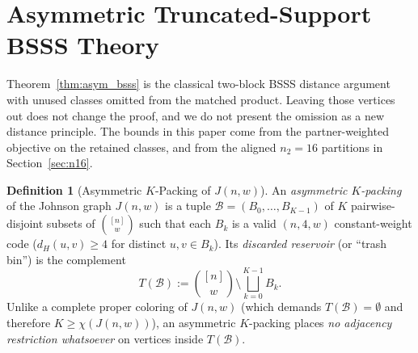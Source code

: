 \documentclass[11pt,letterpaper]{article}
\theoremstyle{plain}
\theoremstyle{definition}
\newtheorem{definition}{Definition}
\theoremstyle{remark}
\begin{document}
\section{Asymmetric Truncated-Support BSSS Theory}
\label{sec:theory}

Theorem~\ref{thm:asym_bsss} is the classical two-block BSSS distance argument with unused classes omitted from the matched product. Leaving those vertices out does not change the proof, and we do not present the omission as a new distance principle. The bounds in this paper come from the partner-weighted objective on the retained classes, and from the aligned $n_2 = 16$ partitions in Section~\ref{sec:n16}.

\begin{definition}[Asymmetric $K$-Packing of $J(n, w)$]
An \emph{asymmetric $K$-packing} of the Johnson graph $J(n, w)$ is a tuple $\mathcal{B} = (B_0, \dots, B_{K-1})$ of $K$ pairwise-disjoint subsets of $\binom{[n]}{w}$ such that each $B_k$ is a valid $(n, 4, w)$ constant-weight code ($d_H(u, v) \ge 4$ for distinct $u, v \in B_k$). Its \emph{discarded reservoir} (or ``trash bin'') is the complement
\begin{equation}
\label{eq:trash}
T(\mathcal{B}) := \binom{[n]}{w} \setminus \bigsqcup_{k=0}^{K-1} B_k.
\end{equation}
Unlike a complete proper coloring of $J(n, w)$ (which demands $T(\mathcal{B}) = \emptyset$ and therefore $K \ge \chi(J(n, w))$), an asymmetric $K$-packing places \emph{no adjacency restriction whatsoever} on vertices inside $T(\mathcal{B})$.
\end{definition}
\end{document}

